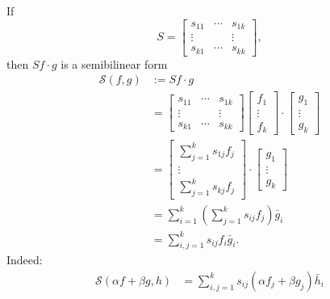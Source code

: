 \documentclass[10.5pt, oneside, a4paper]{article}
\begin{document}
\begin{rmk}
    If
    \[S = \begin{bmatrix}
        s_{11} & \cdots & s_{1k}\\
        \vdots &  & \vdots\\
        s_{k1} & \cdots & s_{kk}
    \end{bmatrix},\]
    then $Sf\cdot g$ is a semibilinear form
    {\color{blue}    
    \begin{equation}\label{eq:semibilinear form}
        \begin{split}
        \mathcal{S}(f,g) &:= Sf\cdot g\\
        &= \begin{bmatrix}
            s_{11} & \cdots & s_{1k}\\
            \vdots & & \vdots\\
            s_{k1} & \cdots & s_{kk}
        \end{bmatrix} \begin{bmatrix}
            f_1\\
            \vdots\\
            f_k
        \end{bmatrix} \cdot \begin{bmatrix}
            g_1\\
            \vdots\\
            g_k
        \end{bmatrix}\\
        &= \begin{bmatrix}
            \sum_{j=1}^k s_{1j}f_j\\
            \vdots\\
            \sum_{j=1}^k s_{kj}f_j
        \end{bmatrix}\cdot \begin{bmatrix}
            g_1\\
            \vdots\\
            g_k
        \end{bmatrix}\\
        &= \sum_{i=1}^k\left(\sum_{j=1}^k s_{ij}f_j\right)\bar{g}_i\\
        &=\sum_{i,j=1}^k s_{ij}f_i\bar{g}_i. 
        \end{split}
    \end{equation}
    Indeed:
    \begin{align*}
        \mathcal{S}(\alpha f+\beta g, h)
        &= \sum_{i,j=1}^k s_{ij}(\alpha f_j + \beta g_j)\bar{h}_i\\

\end{align*}}
\end{rmk}
\end{document}
